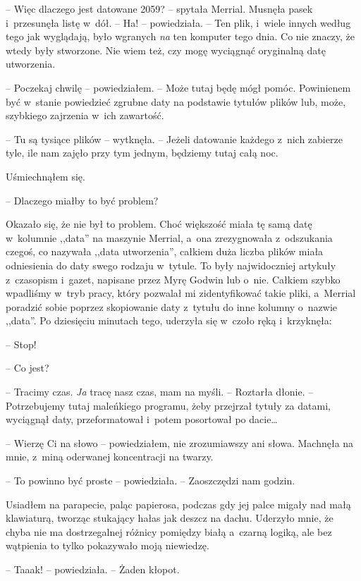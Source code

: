 \documentclass[oneside,polish,11pt,sfheadings]{mwbk}
\begin{document}
-- Więc dlaczego jest datowane 2059? -- spytała Merrial. Musnęła pasek i~przesunęła listę w~dół. -- Ha! -- powiedziała. -- Ten plik, i~wiele innych
według tego jak wyglądają, było wgranych \textit{na} ten komputer tego
dnia. Co nie znaczy, że wtedy były stworzone. Nie wiem też, czy mogę
wyciągnąć oryginalną datę utworzenia.

-- Poczekaj chwilę -- powiedziałem. -- Może tutaj będę mógł pomóc.
Powinienem być w~stanie powiedzieć zgrubne daty na podstawie tytułów
plików lub, może, szybkiego zajrzenia w~ich zawartość.

-- Tu są tysiące plików -- wytknęła. -- Jeżeli datowanie każdego z~nich
zabierze tyle, ile nam zajęło przy tym jednym, będziemy tutaj całą noc.

Uśmiechnąłem się. 

-- Dlaczego miałby to być problem?

Okazało się, że nie był to problem. Choć większość miała tę samą datę w~kolumnie ,,data'' na maszynie Merrial, a~ona zrezygnowała z~odszukania
czegoś, co nazywała ,,data utworzenia'', całkiem duża liczba plików
miała odniesienia do daty swego rodzaju w~tytule. To były najwidoczniej
artykuły z~czasopism i~gazet, napisane przez Myrę Godwin lub o~nie.
Całkiem szybko wpadliśmy w~tryb pracy, który pozwalał mi zidentyfikować
takie pliki, a~Merrial poradzić sobie poprzez skopiowanie daty z~tytułu
do inne kolumny o~nazwie ,,data''. Po dziesięciu minutach tego, uderzyła
się w~czoło ręką i~krzyknęła: 

-- Stop!

-- Co jest?

-- Tracimy czas. \textit{Ja} tracę nasz czas, mam na myśli. -- Roztarła
dłonie. -- Potrzebujemy tutaj maleńkiego programu, żeby przejrzał tytuły
za datami, wyciągnął daty, przeformatował i~potem posortował po dacie\ldots

-- Wierzę Ci na słowo -- powiedziałem, nie zrozumiawszy ani słowa.
Machnęła na mnie, z~miną oderwanej koncentracji na twarzy.

-- To powinno być proste -- powiedziała. -- Zaoszczędzi nam godzin.

Usiadłem na parapecie, paląc papierosa, podczas gdy jej palce migały nad
małą klawiaturą, tworząc stukający hałas jak deszcz na dachu. Uderzyło
mnie, że chyba nie ma dostrzegalnej różnicy pomiędzy białą a~czarną
logiką, ale bez wątpienia to tylko pokazywało moją niewiedzę.

-- Taaak! -- powiedziała. -- Żaden kłopot.
\end{document}
